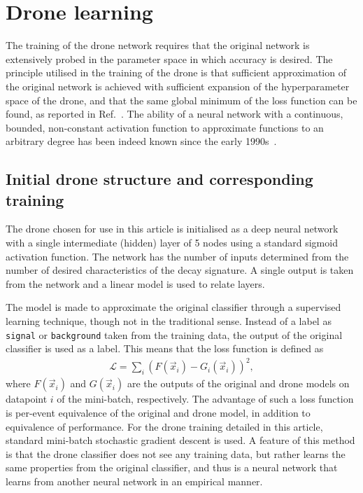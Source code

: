\section{Drone learning}
\label{sec:dlearn}

The training of the drone network requires that the original network is
extensively probed in the parameter space in which accuracy is desired.
The principle utilised in the training of the drone is that sufficient
approximation of the original network is achieved with sufficient expansion
of the hyperparameter space of the drone, and that the same global minimum
of the loss function can be found, as reported in Ref.~\cite{losssurfaces}.
The ability of a neural network with a continuous, bounded, non-constant activation
function to approximate functions to an arbitrary degree has been indeed known
since the early 1990s~\cite{HORNIK1991251}.

\subsection{Initial drone structure and corresponding training}

The drone chosen for use in this article is initialised as a
deep neural network with a single intermediate (hidden) layer of 5
nodes using a standard sigmoid activation function. The network
has the number of inputs determined from the number of desired
characteristics of the decay signature. A single output is taken
from the network and a linear model is used to relate layers.

The model is made to approximate the original classifier through
a supervised learning technique, though not in the traditional sense.
Instead of a label as {\tt signal} or {\tt background} taken from the training data, the
output of the original classifier is used as a label. This means that the
loss function is defined as
\begin{align}
\mathcal{L} = \sum_i \left( F(\vec{x}_i) - G_i(\vec{x}_i) \right)^2,
\end{align}
where $F(\vec{x}_i)$ and $G(\vec{x}_i)$ are the outputs
of the original and drone models on datapoint
$i$ of the mini-batch, respectively. The advantage of such a loss function is per-event
equivalence of the original and drone model, in addition to equivalence
of performance. For the drone training detailed in this article, standard
mini-batch stochastic gradient descent is used. A feature of this method
is that the drone classifier does not see any training data,
but rather learns the same properties from the original classifier,
and thus is a neural network that learns from another neural network in an
empirical manner.

